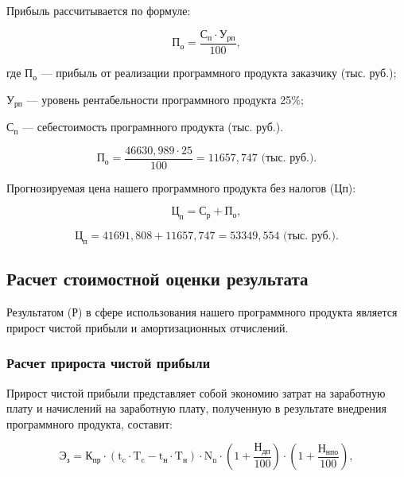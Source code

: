 Прибыль рассчитывается по формуле:

\begin{equation}
  \text{П}_{\text{о}} = \frac{\text{С}_{\text{п}} \cdot \text{У}_{\text{рп}}}{100},
\end{equation}

где \(\text{П}_{\text{о}}\) --- прибыль от реализации программного продукта заказчику (тыс. руб.);

\(\text{У}_{\text{рп}}\) --- уровень рентабельности программного продукта 25\%; 

\(\text{С}_{\text{п}}\) --- себестоимость програмнного продукта (тыс. руб.).

\begin{equation}
  \text{П}_{\text{о}} = \frac{46630,989 \cdot 25}{100} = 11657,747 \text{ (тыс. руб.)}.
\end{equation}

Прогнозируемая цена нашего программного продукта без налогов (Цп): 

\begin{equation}
  \text{Ц}_{\text{п}} = \text{С}_{\text{р}} + \text{П}_{\text{о}},
\end{equation}

\begin{equation}
  \text{Ц}_{\text{п}} = 41691,808+11657,747 = 53349,554 \text{ (тыс. руб.)}.
\end{equation}

\subsection{Расчет стоимостной оценки результата}

Результатом (Р) в сфере использования нашего программного продукта является прирост чистой прибыли и амортизационных отчислений.

\subsubsection{Расчет прироста чистой прибыли}

Прирост чистой прибыли представляет собой экономию затрат на заработную плату и начислений на заработную плату, полученную в результате внедрения программного продукта, составит:

\begin{equation}
  \text{Э}_{\text{з}} = \text{К}_{\text{пр}}\cdot(\text{t}_{\text{c}}\cdot\text{T}_{\text{c}}-\text{t}_{\text{н}}\cdot\text{T}_{\text{н}})\cdot\text{N}_{\text{n}}\cdot
  (1+\frac{\text{Н}_{\text{дп}}}{100})\cdot(1+\frac{\text{Н}_{\text{нпо}}}{100}),
\end{equation}

